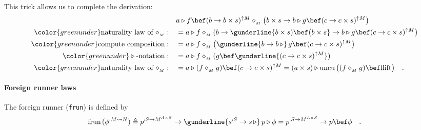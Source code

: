 This trick allows us to complete the derivation:
\begin{align*}
 & a\triangleright f\bef(b\rightarrow b\times s)^{\uparrow M}\diamond_{_{M}}\big(b\times s\rightarrow b\triangleright g\bef(c\rightarrow c\times s)^{\uparrow M}\big)\\
{\color{greenunder}\text{naturality law of }\diamond_{_{M}}:}\quad & =a\triangleright f\diamond_{_{M}}(b\rightarrow\gunderline{b\times s)\bef\big(b\times s}\rightarrow b\triangleright g\bef(c\rightarrow c\times s)^{\uparrow M}\big)\\
{\color{greenunder}\text{compute composition}:}\quad & =a\triangleright f\diamond_{_{M}}\big(\gunderline{b\rightarrow b\,\triangleright}\,g\bef(c\rightarrow c\times s)^{\uparrow M}\big)\\
{\color{greenunder}\triangleright\text{-notation}:}\quad & =a\triangleright f\diamond_{_{M}}(g\bef\gunderline{(c\rightarrow c\times s)^{\uparrow M}})\\
{\color{greenunder}\text{naturality law of }\diamond_{_{M}}:}\quad & =a\triangleright(f\diamond_{_{M}}g)\bef(c\rightarrow c\times s)^{\uparrow M}=\left(a\times s\right)\triangleright\text{uncu}\,\big((f\diamond_{_{M}}g)\bef\text{flift}\big)\quad.
\end{align*}
 

\paragraph{Foreign runner laws}

The foreign runner (\lstinline!frun!) is defined by
\[
\text{frun}\,(\phi^{:M\leadsto N})\triangleq p^{:S\rightarrow M^{A\times S}}\rightarrow\gunderline{s^{:S}\rightarrow s\,\triangleright}\,p\triangleright\phi=p^{:S\rightarrow M^{A\times S}}\rightarrow p\bef\phi\quad.
\]

